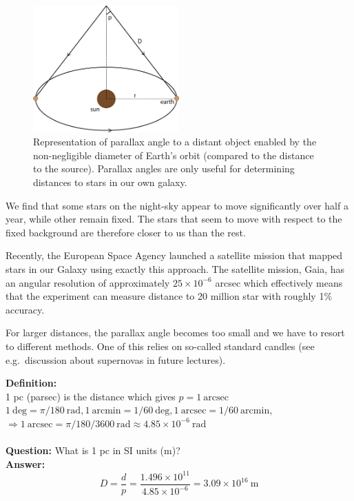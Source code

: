 \documentclass[a4paper,12pt]{article}
\theoremstyle{remark}
\newcommand{\mrm}[1]{\mathrm{#1}}
\renewcommand{\=}[1]{\stackrel{#1}{=}} %
\theoremstyle{plain}
\theoremstyle{definition}
\begin{document}

\begin{figure}[t]
\begin{center}
    \includegraphics*[angle=0,width=0.5\textwidth]{img/parallax.png}
    \caption[Insert text]{Representation of parallax angle to a distant object enabled by the non-negligible diameter of Earth's orbit (compared to the distance to the source). Parallax angles are only useful for determining distances to stars in our own galaxy.}
\label{fig:parallax}
\end{center}
\end{figure}

We find that some stars on the night-sky appear to move significantly over half a year, while other remain fixed. The stars that seem to move with respect to the fixed background are therefore closer to us than the rest.

Recently, the European Space Agency launched a satellite mission that mapped stars in our Galaxy using exactly this approach. The satellite mission, Gaia, has an angular resolution of approximately $25 \times 10^{-6}$ arcsec which effectively means that the experiment can measure distance to 20 million star with roughly 1\% accuracy.

For larger distances, the parallax angle becomes too small and we have to resort to different methods. One of this relies on so-called standard candles (see e.g.\ discussion about supernovas in future lectures).

\textbf{Definition:} \\
1 pc (parsec) is the distance which gives $p = 1 \ \mrm{arcsec}$ \\
$1 \ \mrm{deg} = \pi / 180 \ \mrm{rad}, 1 \ \mrm{arcmin} = 1/60 \ \mrm{deg}, 1 \ \mrm{arcsec} = 1/60 \ \mrm{arcmin}$,  \\
$\Rightarrow 1 \ \mrm{arcsec} = \pi / 180 / 3600 \ \mrm{rad} \approx 4.85 \times 10^{-6} \ \mrm{rad}$ \\ \\
\textbf{Question:} What is 1 pc in SI units (m)? \\
\textbf{Answer:}
\begin{equation}
D = \frac{d}{p} = \frac{1.496 \times 10^{11} }{4.85 \times 10^{-6}} = 3.09 \times 10^{16} \ \mrm{m}
\end{equation}
\end{document}

